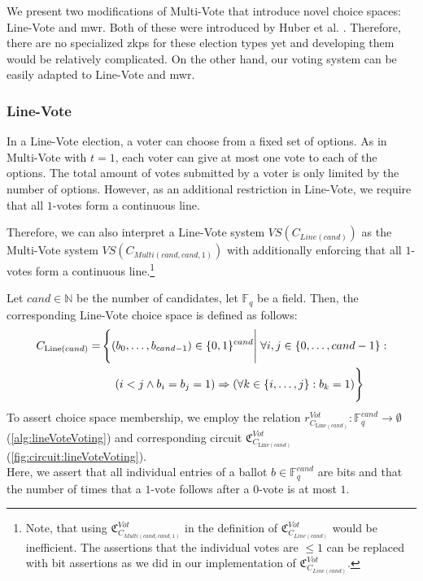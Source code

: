 We present two modifications of Multi-Vote that introduce novel choice spaces: Line-Vote and \gls{mwr}.
Both of these were introduced by Huber et al. \cite{huber_zk-snarks_2025}.
Therefore, there are no specialized \glspl{zkp} for these election types yet and developing them would be relatively complicated.
On the other hand, our voting system can be easily adapted to Line-Vote and \gls{mwr}.

\subsubsection{Line-Vote}
In a Line-Vote election, a voter can choose from a fixed set of options.
As in Multi-Vote with $t=1$, each voter can give at most one vote to each of the options.
The total amount of votes submitted by a voter is only limited by the number of options.
However, as an additional restriction in Line-Vote, we require that all $1$-votes form a continuous line.

Therefore, we can also interpret a Line-Vote system $VS(C_{Line(cand)})$ as the Multi-Vote system $VS(C_{Multi(cand, cand, 1)})$ with additionally enforcing that all $1$-votes form a continuous line.\footnote{
    \label{footnote:lineVoteAsMultiVoteInefficient}
    Note, that using $\mathfrak{C}_{C_{Multi(cand, cand, 1)}}^{Vot}$ in the definition of $\mathfrak{C}_{C_{Line(cand)}}^{Vot}$ would be inefficient.
    The assertions that the individual votes are $\leq 1$ can be replaced with bit assertions as we did in our implementation of $\mathfrak{C}_{C_{Line(cand)}}^{Vot}$.
}

\begin{definition}
    Let $cand\in\mathbb{N}$ be the number of candidates, let $\mathbb{F}_q$ be a field.
    Then, the corresponding Line-Vote choice space is defined as follows:
    {\setlength{\mathindent}{2pt}
    \begin{align*}
        C_{\text{Line}(cand)}=& \left\{(b_0,\dots, b_{cand-1})\in \{0,1\}^{cand}\Bigg|\right. \forall i, j \in \{0,\dots, cand-1\}:\\
        & \quad \left.\vphantom{\Bigg|}(i<j\land b_i=b_j=1)\Rightarrow (\forall k\in\{i,\dots, j\}: b_k=1)\right\}
    \end{align*}
    }
    To assert choice space membership, we employ the relation $r_{C_{\text{Line}(cand)}}^{Vot}:\mathbb{F}_q^{cand}\to\emptyset$ (\cref{alg:lineVoteVoting}) and corresponding circuit $\mathfrak{C}_{C_{\text{Line}(cand)}}^{Vot}$ (\cref{fig:circuit:lineVoteVoting}).\\
    Here, we assert that all individual entries of a ballot $b\in\mathbb{F}_q^{cand}$ are bits and that the number of times that a $1$-vote follows after a $0$-vote is at most $1$.
\end{definition}

